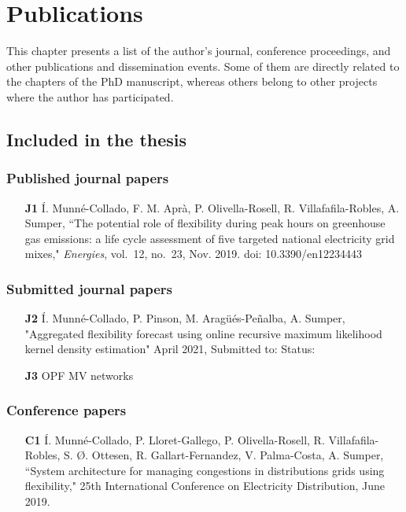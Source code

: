 \chapter{Publications}
This chapter presents a list of the author's journal, conference proceedings, and other publications and dissemination events. Some of them are directly related to the chapters of the PhD manuscript, whereas others belong to other projects where the author has participated. 

\section*{Included in the thesis}
\subsection*{Published journal papers}

\begin{itemize}
	
	\item[\textbf{J1}] \'{I}. Munn\'{e}-Collado, F. M. Apr\`{a}, P. Olivella-Rosell, R. Villafafila-Robles, A. Sumper, ``The potential role of flexibility during peak hours on greenhouse gas emissions: a life cycle assessment of five targeted national electricity grid mixes," \textit{Energies}, vol.~12, no.~23, Nov. 2019. doi: 10.3390/en12234443
	
\end{itemize}

\subsection*{Submitted journal papers}
\begin{itemize}
	\item [\textbf{J2}] \'{I}. Munn\'{e}-Collado, P. Pinson, M. Arag\"{u}\'{e}s-Pe\~{n}alba, A. Sumper, "Aggregated flexibility forecast using online recursive maximum likelihood kernel density estimation" April 2021, Submitted to:  Status:
	\item [\textbf{J3}] OPF MV networks 
\end{itemize}

\subsection*{Conference papers}

\begin{itemize}
	\item[\textbf{C1}] \'{I}. Munn\'{e}-Collado, P. Lloret-Gallego, P. Olivella-Rosell, R. Villafafila-Robles, S. \O{}. Ottesen, R. Gallart-Fernandez, V. Palma-Costa, A. Sumper, ``System architecture for managing congestions in distributions grids using flexibility," 25th International Conference on Electricity Distribution, June 2019.
\end{itemize}

